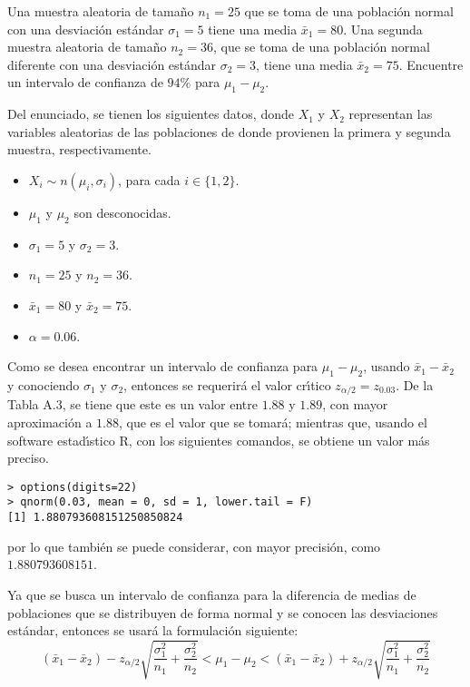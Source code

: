 \begin{enunciado}
 Una muestra aleatoria de tama\~no $n_1 = 25$ que se toma de una poblaci\'on normal con una desviaci\'on est\'andar $\sigma_1 = 5$ tiene una media $\bar{x}_1 =80$. Una segunda muestra aleatoria de tama\~no $n_2 = 36$, que se toma de una poblaci\'on normal diferente con una desviaci\'on est\'andar $\sigma_2 = 3$, tiene una media $\bar{x}_2 = 75$. Encuentre un intervalo de confianza de $94\%$ para $\mu_1 - \mu_2$.
\end{enunciado}

\begin{solucion}
 Del enunciado, se tienen los siguientes datos, donde $X_1$ y $X_2$ representan las variables aleatorias de las poblaciones de donde provienen la primera y segunda muestra, respectivamente.
 \begin{itemize}
  \item $X_i \sim n(\mu_i,\sigma_i)$, para cada $i\in\{1,2\}$.
  \item $\mu_1$ y $\mu_2$ son desconocidas.
  \item $\sigma_1 = 5$ y $\sigma_2 = 3$.
  \item $n_1 = 25$ y $n_2 = 36$.
  \item $\bar{x}_1 = 80$ y $\bar{x}_2 = 75$.
  \item $\alpha = 0.06$.
 \end{itemize}
 Como se desea encontrar un intervalo de confianza para $\mu_1-\mu_2$, usando $\bar{x}_1-\bar{x}_2$ y conociendo $\sigma_1$ y $\sigma_2$, entonces se requerir\'a el valor cr\'{\i}tico $z_{\alpha/2} = z_{0.03}$. De la Tabla A.3, se tiene que este es un valor entre $1.88$ y $1.89$, con mayor aproximaci\'on a $1.88$, que es el valor que se tomar\'a; mientras que, usando el software estad\'{\i}stico R, con los siguientes comandos, se obtiene un valor m\'as preciso.
 \begin{verbatim}
> options(digits=22)
> qnorm(0.03, mean = 0, sd = 1, lower.tail = F)
[1] 1.880793608151250850824
 \end{verbatim}
 \vspace{-0.5cm}
 por lo que tambi\'en se puede considerar, con mayor precisi\'on, como $1.880793608151$.
 \par 
 Ya que se busca un intervalo de confianza para la diferencia de medias de poblaciones que se distribuyen de forma normal y se conocen las desviaciones est\'andar, entonces se usar\'a la formulaci\'on siguiente:
 \begin{equation*}
  \left( \bar{x}_1 - \bar{x}_2 \right) - z_{\alpha/2}\sqrt{\frac{\sigma_1^2}{n_1} + \frac{\sigma_2^2}{n_2}} < \mu_1 - \mu_2 < \left( \bar{x}_1 - \bar{x}_2 \right) + z_{\alpha/2}\sqrt{\frac{\sigma_1^2}{n_1} + \frac{\sigma_2^2}{n_2}}

\end{equation*}
\end{solucion}

